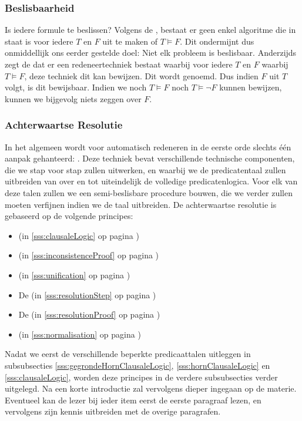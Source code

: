 \subsubsection{Beslisbaarheid}
Is iedere formule te beslissen? Volgens de , bestaat er geen enkel algoritme die in staat is voor iedere $T$ en $F$ uit te maken of $T\vDash F$. Dit ondermijnt dus onmiddellijk ons eerder gestelde doel: Niet elk probleem is beslisbaar. Anderzijds zegt de  dat er een redeneertechniek bestaat waarbij voor iedere $T$ en $F$ waarbij $T\vDash F$, deze techniek dit kan bewijzen. Dit wordt  genoemd. Dus indien $F$ uit $T$ volgt, is dit bewijsbaar. Indien we noch $T\vDash F$ noch $T\vDash \neg F$ kunnen bewijzen, kunnen we bijgevolg niets zeggen over $F$.
\subsubsection{Achterwaartse Resolutie}
In het algemeen wordt voor automatisch redeneren in de eerste orde slechts één aanpak gehanteerd: . Deze techniek bevat verschillende technische componenten, die we stap voor stap zullen uitwerken, en waarbij we de predicatentaal zullen uitbreiden van  over  en  tot uiteindelijk de volledige predicatenlogica. Voor elk van deze talen zullen we een semi-beslisbare procedure bouwen, die we verder zullen moeten verfijnen indien we de taal uitbreiden. De achterwaartse resolutie is gebaseerd op de volgende principes:
\begin{itemize}
 \item {} (in \ref{sss:clausaleLogic} op pagina \pageref{sss:clausaleLogic})
 \item {} (in \ref{sss:inconsistenceProof} op pagina \pageref{sss:inconsistenceProof})
 \item {} (in \ref{sss:unification} op pagina \pageref{sss:unification})
 \item De  (in \ref{sss:resolutionStep} op pagina \pageref{sss:resolutionStep})
 \item De  (in \ref{sss:resolutionProof} op pagina \pageref{sss:resolutionProof})
 \item {} (in \ref{sss:normalisation} op pagina \pageref{sss:normalisation})
\end{itemize}
Nadat we eerst de verschillende beperkte predicaattalen uitleggen in subsubsecties \ref{sss:gegrondeHornClausaleLogic}, \ref{sss:hornClausaleLogic} en \ref{sss:clausaleLogic}, worden
deze principes in de  verdere subsubsecties verder uitgelegd. Na een korte introductie zal vervolgens dieper ingegaan op de materie. Eventueel kan de lezer bij ieder item eerst de eerste paragraaf lezen, en vervolgens zijn kennis uitbreiden met de overige paragrafen.
